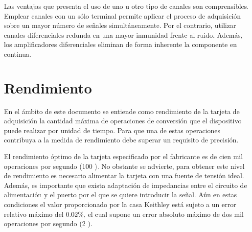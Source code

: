 Las ventajas que presenta el uso de uno u otro tipo de canales son
comprensibles. Emplear canales con un sólo terminal permite aplicar el
proceso de adquisición sobre un mayor número de señales simultáneamente.
Por el contrario, utilizar canales diferenciales redunda en una mayor
inmunidad frente al ruido. Además, los amplificadores diferenciales
eliminan de forma inherente la componente en continua.


\section{Rendimiento}\label{sec:throughput}

En el ámbito de este documento se entiende como rendimiento de la tarjeta
de adquisición la cantidad máxima de operaciones de conversión que el
dispositivo puede realizar por unidad de tiempo. Para que una de estas
operaciones contribuya a la medida de rendimiento debe superar un requisito
de precisión.

El rendimiento óptimo de la tarjeta \kpci{} especificado por el fabricante
es de cien mil operaciones por segundo (100 \kms{}). No obstante se
advierte, para obtener este nivel de rendimiento es necesario alimentar la
tarjeta con una fuente de tensión ideal. Además, es importante que exista
adaptación de impedancias entre el circuito de alimentación y el puerto por
el que se quiere introducir la señal. Aún en estas condiciones el valor
proporcionado por la casa Keithley está sujeto a un error relativo máximo
del $0.02\%$, el cual supone un error absoluto máximo de dos mil
operaciones por segundo (2 \kms{}).

